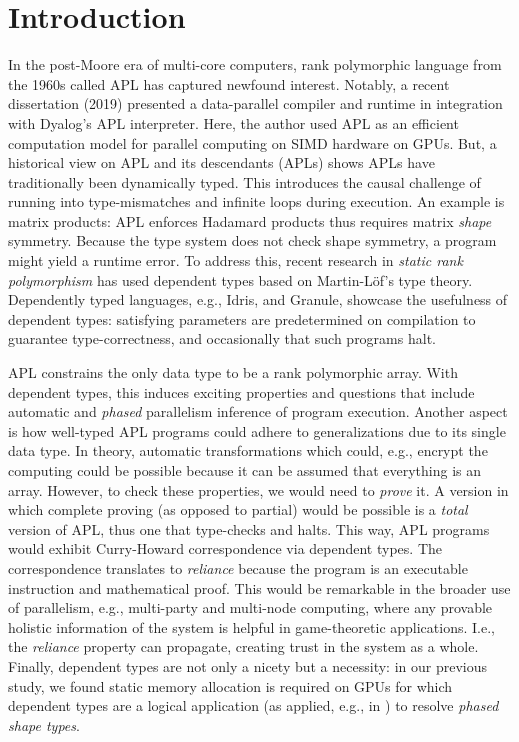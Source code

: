 \documentclass{report}
\begin{document}
\tableofcontents
\newpage

\chapter{Introduction}

In the post-Moore era of multi-core computers, rank polymorphic language from the 1960s called \gls{APL} has captured newfound interest. Notably, a recent dissertation \cite{hsu2019phd} (2019) presented a data-parallel compiler and runtime in integration with Dyalog's APL interpreter. Here, the author used APL as an efficient computation model for parallel computing on \gls{SIMD} hardware on \glspl{GPU}. But, a historical view on APL and its descendants (APLs) \cite{hui2020apl} shows APLs have traditionally been dynamically typed. This introduces the causal challenge of running into type-mismatches and infinite loops during execution. An example is matrix products: APL enforces Hadamard products thus requires matrix \emph{shape} symmetry. Because the type system does not check shape symmetry, a program might yield a runtime error. To address this, recent research in \emph{static rank polymorphism} has used dependent types based on Martin-Löf's type theory. Dependently typed languages, e.g., Idris, and Granule, showcase the usefulness of dependent types: satisfying parameters are predetermined on compilation to guarantee type-correctness, and occasionally that such programs halt.

APL constrains the only data type to be a rank polymorphic array. With dependent types, this induces exciting properties and questions that include automatic and \emph{phased} parallelism inference of program execution. Another aspect is how well-typed APL programs could adhere to generalizations due to its single data type. In theory, automatic transformations which could, e.g., encrypt the computing could be possible because it can be assumed that everything is an array. However, to check these properties, we would need to \emph{prove} it. A version in which complete proving (as opposed to partial) would be possible is a \emph{total} version of APL, thus one that type-checks and halts. This way, APL programs would exhibit Curry-Howard correspondence via dependent types. The correspondence translates to \emph{reliance} because the program is an executable instruction and mathematical proof. This would be remarkable in the broader use of parallelism, e.g., multi-party and multi-node computing, where any provable holistic information of the system is helpful in game-theoretic applications. I.e., the \emph{reliance} property can propagate, creating trust in the system as a whole. Finally, dependent types are not only a nicety but a necessity: in our previous study, we found static memory allocation is required on GPUs \cite{gpupoly} for which dependent types are a logical application (as applied, e.g., in \cite{neut}) to resolve \emph{phased shape types}.
\end{document}
